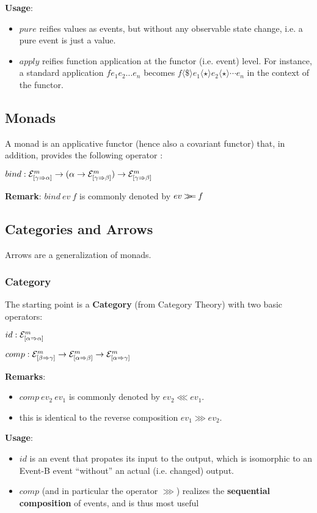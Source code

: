 \documentclass{article}
\newcommand{\EV}[3]{\ensuremath{{\cal{E}}^{#1}_{[#2 \Rightarrow #3]}}}
\newcommand{\FMAP}{\ensuremath{\langle \$ \rangle}}
\newcommand{\APPLY}{\ensuremath{\langle \star \rangle}}
\newcommand{\BIND}{\mathbin{>\!\!\!>\mkern-6.7mu=}}
\newcommand{\COMP}{\lll} %
\newcommand{\SEQ}{\ggg} %
\begin{document}
\textbf{Usage}: 
\begin{itemize}
\item $pure$ reifies values as events, but without any observable state change, i.e. a pure event is just a value.
\item $apply$ reifies function application at the functor (i.e. event) level. For instance, a standard application $f e_1 e_2 \ldots e_n$ becomes $f \FMAP e_1 \APPLY e_2 \APPLY \cdots e_n$ in the context of the functor. 
\end{itemize}

\subsection{Monads}

A monad is an applicative functor (hence also a covariant functor) that, in addition, provides the following operator :

$bind: \EV{m}{\gamma}{\alpha} \rightarrow (\alpha \rightarrow \EV{m}{\gamma}{\beta}) \rightarrow \EV{m}{\gamma}{\beta}$

\textbf{Remark}: $bind~ev~f$ is commonly denoted by $ev \BIND f$

\subsection{Categories and Arrows}

Arrows are a generalization of monads.

\subsubsection{Category}

The starting point is a \textbf{Category} (from Category Theory) with two basic operators:

$id : \EV{m}{\alpha}{\alpha}$

$comp : \EV{m}{\beta}{\gamma} \rightarrow \EV{m}{\alpha}{\beta} \rightarrow \EV{m}{\alpha}{\gamma}$

\textbf{Remarks}:  
\begin{itemize}
\item $comp~ev_2~ev_1$ is commonly denoted by $ev_2 \COMP ev_1$. 
\item this is identical to the reverse composition $ev_1 \SEQ ev_2$.
\end{itemize}

\textbf{Usage}:
\begin{itemize}
\item $id$ is an event that propates its input to the output, which is isomorphic to an Event-B event ``without'' an actual (i.e. changed) output.
\item $comp$ (and in particular the operator $\SEQ$) realizes the \textbf{sequential composition} of events, and is thus most useful
\end{itemize}
\end{document}

